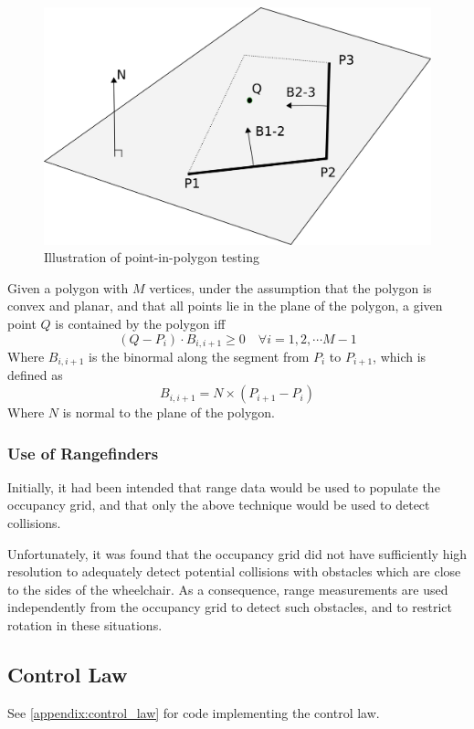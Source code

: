 \documentclass[oneside,final,a4paper]{report}
\begin{document}
\begin{figure}
 \centering
 \includegraphics[scale=0.9]{point-in-poly}
 \caption{Illustration of point-in-polygon testing}
 \label{fig:point-in-poly}
\end{figure}

Given a polygon with $M$ vertices, under the assumption that the polygon is convex and planar, and that all points lie in the plane of the polygon, a given point $Q$ is contained by the polygon iff 
\begin{equation}
 (Q-P_i) \cdot B_{i,i+1} \ge 0 \quad \forall i = 1, 2, \cdots M-1
\end{equation}
Where $B_{i,i+1}$ is the binormal along the segment from $P_i$ to $P_{i+1}$, which is defined as
\begin{equation}
 B_{i,i+1} = N \times (P_{i+1} - P_{i})
\end{equation}
Where $N$ is normal to the plane of the polygon.

\subsubsection{Use of Rangefinders}
Initially, it had been intended that range data would be used to populate the occupancy grid, and that only the above technique would be used to detect collisions.  

Unfortunately, it was found that the occupancy grid did not have sufficiently high resolution to adequately detect potential collisions with obstacles which are close to the sides of the wheelchair.  As a consequence, range measurements are used independently from the occupancy grid to detect such obstacles, and to restrict rotation in these situations.

\subsection{Control Law}
See \ref{appendix:control_law} for code implementing the control law.
\end{document}
